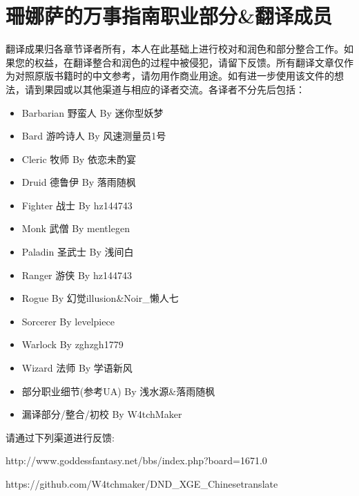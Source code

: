 \clearpage
\chapter{珊娜萨的万事指南职业部分\&翻译成员}

翻译成果归各章节译者所有，本人在此基础上进行校对和润色和部分整合工作。如果您的权益，在翻译整合和润色的过程中被侵犯，请留下反馈。所有翻译文章仅作为对照原版书籍时的中文参考，请勿用作商业用途。如有进一步使用该文件的想法，请到果园或以其他渠道与相应的译者交流。各译者不分先后包括：

\begin{itemize}
\item Barbarian 野蛮人 By 迷你型妖梦
\item Bard 游吟诗人 By 风速测量员1号
\item Cleric 牧师 By 依恋未酌宴
\item Druid 德鲁伊 By 落雨随枫
\item Fighter 战士 By hz144743
\item Monk 武僧 By mentlegen
\item Paladin 圣武士  By 浅间白
\item Ranger 游侠 By hz144743
\item Rogue By 幻觉illusion\&Noir\_懒人七
\item Sorcerer By levelpiece
\item Warlock By zghzgh1779
\item Wizard 法师 By 学语新风
\item 部分职业细节(参考UA)  By 浅水源\&落雨随枫
\item 漏译部分/整合/初校  By W4tchMaker
\end{itemize}

请通过下列渠道进行反馈:

http://www.goddessfantasy.net/bbs/index.php?board=1671.0

https://github.com/W4tchmaker/DND\_XGE\_Chinesetranslate
